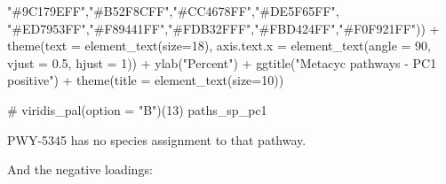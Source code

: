 \documentclass[
  letterpaper,
]{book}
\newenvironment{Shaded}{}{}
\newcommand{\AttributeTok}[1]{\textcolor[rgb]{0.84,0.23,0.29}{#1}}
\newcommand{\CommentTok}[1]{\textcolor[rgb]{0.42,0.45,0.49}{#1}}
\newcommand{\DecValTok}[1]{\textcolor[rgb]{0.00,0.36,0.77}{#1}}
\newcommand{\FloatTok}[1]{\textcolor[rgb]{0.00,0.36,0.77}{#1}}
\newcommand{\FunctionTok}[1]{\textcolor[rgb]{0.44,0.26,0.76}{#1}}
\newcommand{\NormalTok}[1]{\textcolor[rgb]{0.14,0.16,0.18}{#1}}
\newcommand{\SpecialCharTok}[1]{\textcolor[rgb]{0.00,0.36,0.77}{#1}}
\newcommand{\StringTok}[1]{\textcolor[rgb]{0.01,0.18,0.38}{#1}}
\begin{document}
\begin{Shaded}
\begin{Highlighting}[]
                                 \StringTok{"\#9C179EFF"}\NormalTok{,}\StringTok{"\#B52F8CFF"}\NormalTok{,}\StringTok{"\#CC4678FF"}\NormalTok{,}\StringTok{"\#DE5F65FF"}\NormalTok{,}
                                 \StringTok{"\#ED7953FF"}\NormalTok{,}\StringTok{"\#F89441FF"}\NormalTok{,}\StringTok{"\#FDB32FFF"}\NormalTok{,}\StringTok{"\#FBD424FF"}\NormalTok{,}\StringTok{"\#F0F921FF"}\NormalTok{)) }\SpecialCharTok{+}
    \FunctionTok{theme}\NormalTok{(}\AttributeTok{text =} \FunctionTok{element\_text}\NormalTok{(}\AttributeTok{size=}\DecValTok{18}\NormalTok{),}
          \AttributeTok{axis.text.x =} \FunctionTok{element\_text}\NormalTok{(}\AttributeTok{angle =} \DecValTok{90}\NormalTok{, }\AttributeTok{vjust =} \FloatTok{0.5}\NormalTok{, }\AttributeTok{hjust =} \DecValTok{1}\NormalTok{)) }\SpecialCharTok{+}
    \FunctionTok{ylab}\NormalTok{(}\StringTok{"Percent"}\NormalTok{) }\SpecialCharTok{+}
    \FunctionTok{ggtitle}\NormalTok{(}\StringTok{"Metacyc pathways {-} PC1 positive"}\NormalTok{) }\SpecialCharTok{+}
    \FunctionTok{theme}\NormalTok{(}\AttributeTok{title =} \FunctionTok{element\_text}\NormalTok{(}\AttributeTok{size=}\DecValTok{10}\NormalTok{))}

\CommentTok{\# viridis\_pal(option = "B")(13)}
\NormalTok{paths\_sp\_pc1}
\end{Highlighting}
\end{Shaded}

\begin{tcolorbox}[enhanced jigsaw, opacitybacktitle=0.6, bottomtitle=1mm, opacityback=0, colback=white, coltitle=black, leftrule=.75mm, toprule=.15mm, title=\textcolor{quarto-callout-warning-color}{\faExclamationTriangle}\hspace{0.5em}{Warning}, colframe=quarto-callout-warning-color-frame, toptitle=1mm, arc=.35mm, left=2mm, titlerule=0mm, breakable, rightrule=.15mm, bottomrule=.15mm, colbacktitle=quarto-callout-warning-color!10!white]

PWY-5345 has no species assignment to that pathway.

\end{tcolorbox}

And the negative loadings:
\end{document}
